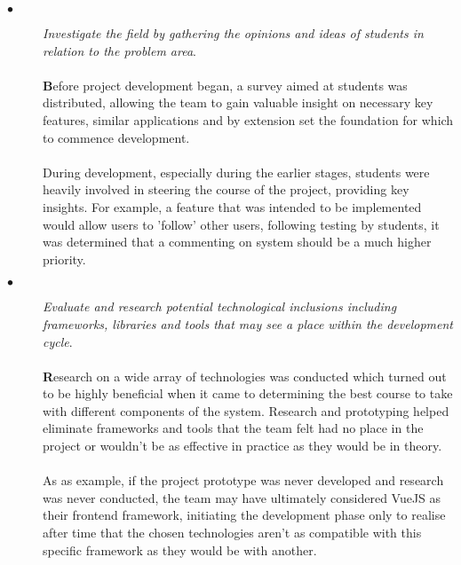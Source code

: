 \begin{description}
  \item[$\bullet$] \textit{Investigate the field by gathering the opinions and ideas of students in relation to the problem area}. 
  
  \paragraph{}
  \textbf{B}efore project development began, a survey aimed at students was distributed, allowing the team to gain valuable insight on necessary key features, similar applications and by extension set the foundation for which to commence development. 
  
  \paragraph{}
  During development, especially during the earlier stages, students were heavily involved in steering the course of the project, providing key insights. For example, a feature that was intended to be implemented would allow users to 'follow' other users, following testing by students, it was determined that a commenting on system should be a much higher priority.

  \item[$\bullet$] \textit{Evaluate and research potential technological inclusions including frameworks, libraries and tools that may see a place within the development cycle}.
  
  \paragraph{}
  \textbf{R}esearch on a wide array of technologies was conducted which turned out to be highly beneficial  when it came to determining the best course to take with different components of the system. Research and prototyping helped eliminate frameworks and tools that the team felt had no place in the project or wouldn't be as effective in practice as they would be in theory.
  
  \paragraph{}
  As as example, if the project prototype was never developed and research was never conducted, the team may have ultimately considered VueJS as their frontend framework, initiating the development phase only to realise after time that the chosen technologies aren't as compatible with this specific framework as they would be with another. 
  

\end{description}
